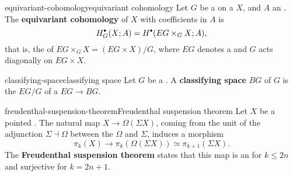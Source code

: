\begin{topic}{equivariant-cohomology}{equivariant cohomology}
    Let $G$ be a   on a  $X$, and $A$ an . The \textbf{equivariant cohomology} of $X$ with coefficients in $A$ is
    \[ H_G^\bdot(X; A) = H^\bdot(EG \times_G X; A), \]
    that is, the  of $EG \times_G X = (EG \times X) / G$, where $EG$ denotes a  and $G$ acts diagonally on $EG \times X$.
\end{topic}

\begin{topic}{classifying-space}{classifying space}
    Let $G$ be a . A \textbf{classifying space} $BG$ of $G$ is the  $EG/G$ of a  $EG \to BG$.
\end{topic}

\begin{topic}{freudenthal-suspension-theorem}{Freudenthal suspension theorem}
    Let $X$ be a pointed  . The natural map $X \to \Omega (\Sigma X)$, coming from the unit of the adjunction $\Sigma \dashv \Omega$ between the  $\Omega$ and  $\Sigma$, induces a morphism
    \[ \pi_k(X) \to \pi_k(\Omega(\Sigma X)) \simeq \pi_{k + 1}(\Sigma X) . \]
    The \textbf{Freudenthal suspension theorem} states that this map is an  for $k \le 2n$ and surjective for $k = 2n + 1$.
\end{topic}
